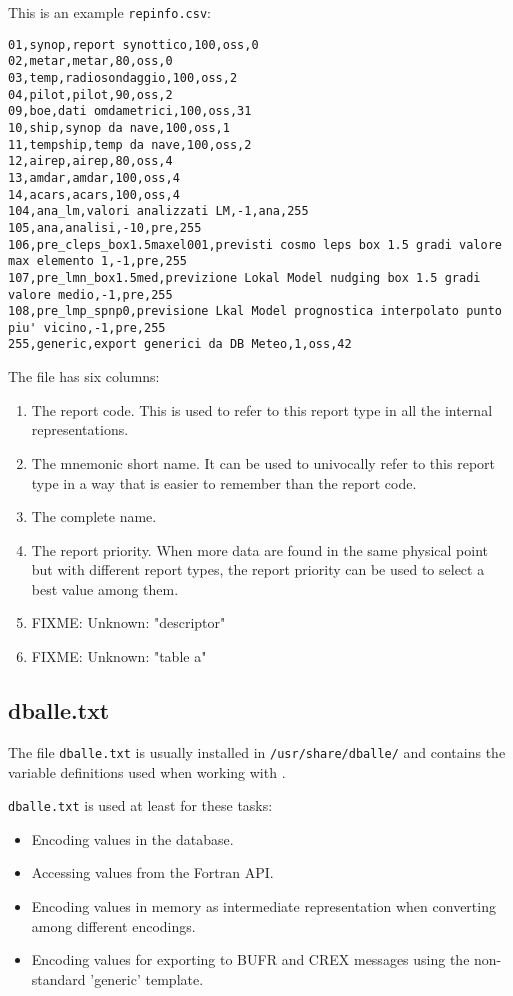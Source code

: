 This is an example {\tt repinfo.csv}:

\begin{verbatim}
01,synop,report synottico,100,oss,0
02,metar,metar,80,oss,0
03,temp,radiosondaggio,100,oss,2
04,pilot,pilot,90,oss,2
09,boe,dati omdametrici,100,oss,31
10,ship,synop da nave,100,oss,1
11,tempship,temp da nave,100,oss,2
12,airep,airep,80,oss,4
13,amdar,amdar,100,oss,4
14,acars,acars,100,oss,4
104,ana_lm,valori analizzati LM,-1,ana,255
105,ana,analisi,-10,pre,255
106,pre_cleps_box1.5maxel001,previsti cosmo leps box 1.5 gradi valore max elemento 1,-1,pre,255
107,pre_lmn_box1.5med,previzione Lokal Model nudging box 1.5 gradi valore medio,-1,pre,255
108,pre_lmp_spnp0,previsione Lkal Model prognostica interpolato punto piu' vicino,-1,pre,255
255,generic,export generici da DB Meteo,1,oss,42
\end{verbatim}

The file has six columns:

\begin{enumerate}
\item The report code.  This is used to refer to this report type in all the
      internal representations.
\item The mnemonic short name.  It can be used to univocally refer to this report
      type in a way that is easier to remember than the report code.
\item The complete name.
\item The report priority.  When more data are found in the same physical point
      but with different report types, the report priority can be used to
      select a best value among them.
\item FIXME: Unknown: "descriptor"
\item FIXME: Unknown: "table a"
\end{enumerate}
  
\subsection{dballe.txt}

The file {\tt dballe.txt} is usually installed in {\tt /usr/share/dballe/} and
contains the variable definitions used when working with \dballe{}.

{\tt dballe.txt} is used at least for these tasks:

\begin{itemize}
\item Encoding values in the \dballe{} database.
\item Accessing values from the Fortran API\cite{FAPI}.
\item Encoding values in memory as intermediate representation when converting
      among different encodings.
\item Encoding values for exporting to BUFR and CREX messages using the
      non-standard 'generic' template.
\end{itemize}

